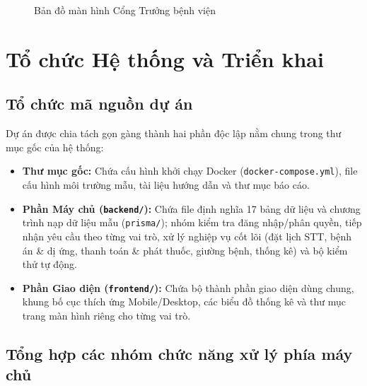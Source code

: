 \documentclass[12pt,a4paper]{report}
\begin{document}
\begin{figure}[H]
  \centering
  \caption{Bản đồ màn hình Cổng Trưởng bệnh viện}
  \label{fig:nav-admin}
\end{figure}

\chapter{Tổ chức Hệ thống và Triển khai}

\section{Tổ chức mã nguồn dự án}

Dự án được chia tách gọn gàng thành hai phần độc lập nằm chung trong thư mục gốc của hệ thống:
\begin{itemize}
  \item \textbf{Thư mục gốc:} Chứa cấu hình khởi chạy Docker (\texttt{docker-compose.yml}), file cấu hình môi trường mẫu, tài liệu hướng dẫn và thư mục báo cáo.
  \item \textbf{Phần Máy chủ (\texttt{backend/}):} Chứa file định nghĩa 17 bảng dữ liệu và chương trình nạp dữ liệu mẫu (\texttt{prisma/}); nhóm kiểm tra đăng nhập/phân quyền, tiếp nhận yêu cầu theo từng vai trò, xử lý nghiệp vụ cốt lõi (đặt lịch STT, bệnh án \& dị ứng, thanh toán \& phát thuốc, giường bệnh, thống kê) và bộ kiểm thử tự động.
  \item \textbf{Phần Giao diện (\texttt{frontend/}):} Chứa bộ thành phần giao diện dùng chung, khung bố cục thích ứng Mobile/Desktop, các biểu đồ thống kê và thư mục trang màn hình riêng cho từng vai trò.
\end{itemize}

\section{Tổng hợp các nhóm chức năng xử lý phía máy chủ}
\end{document}
